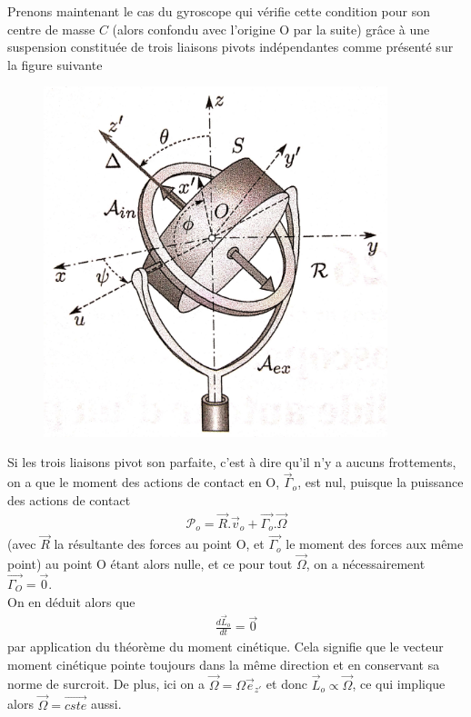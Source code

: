 \documentclass[12pt,prb,aps,epsf]{article}
\begin{document}
Prenons maintenant le cas du gyroscope qui vérifie cette condition pour son centre de masse $C$ (alors confondu avec l'origine O par la suite) grâce à une suspension constituée de trois liaisons pivots indépendantes comme présenté sur la figure suivante\\

\begin{figure}[h]
	\centerline{\includegraphics[width=10cm]{gyroscope}}
\end{figure}

Si les trois liaisons pivot son parfaite, c'est à dire qu'il n'y a aucuns frottements, on a que le moment des actions de contact en O, $\vec{\Gamma}_o$, est nul, puisque la puissance des actions de contact 
\begin{eqnarray}
\mathcal{P}_o = \vec{R}.\vec{v}_o + \vec{\Gamma_o}.\vec{\Omega}
\end{eqnarray}
(avec $\vec{R}$ la résultante des forces au point O, et $\vec{\Gamma_o}$ le moment des forces aux même point) au point O étant alors nulle, et ce pour tout $\vec{\Omega}$, on a nécessairement $\vec{\Gamma_O} = \vec{0}$.\\

On en déduit alors que 
\begin{eqnarray}
\frac{d\vec{L}_o}{dt} = \vec{0}
\end{eqnarray}
par application du théorème du moment cinétique. Cela signifie que le vecteur moment cinétique pointe toujours dans la même direction et en conservant sa norme de surcroit.
De plus, ici on a $\vec{\Omega} = \Omega\vec{e}_{z'}$ et donc $\vec{L}_o \propto \vec{\Omega}$, ce qui implique alors $ \vec{\Omega} = \vec{cste}$ aussi.\\
\end{document}
